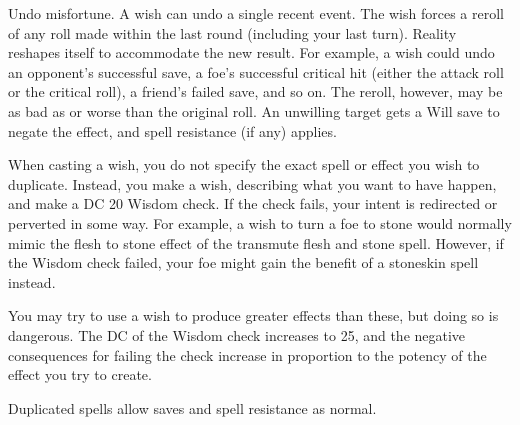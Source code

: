 \begin{spelleffect}
\begin{itemize*}
    \item Undo misfortune. A wish can undo a single recent event. The wish forces a reroll of any roll made within the last round (including your last turn). Reality reshapes itself to accommodate the new result. For example, a wish could undo an opponent's successful save, a foe's successful critical hit (either the attack roll or the critical roll), a friend's failed save, and so on. The reroll, however, may be as bad as or worse than the original roll. An unwilling target gets a Will save to negate the effect, and spell resistance (if any) applies.
  \end{itemize*}
  \par When casting a wish, you do not specify the exact spell or effect you wish to duplicate. Instead, you make a wish, describing what you want to have happen, and make a DC 20 Wisdom check. If the check fails, your intent is redirected or perverted in some way. For example, a wish to turn a foe to stone would normally mimic the flesh to stone effect of the transmute flesh and stone spell. However, if the Wisdom check failed, your foe might gain the benefit of a stoneskin spell instead.
  \par You may try to use a wish to produce greater effects than these, but doing so is dangerous. The DC of the Wisdom check increases to 25, and the negative consequences for failing the check increase in proportion to the potency of the effect you try to create.
\end{spelleffect}
\begin{spellnotes}
  Duplicated spells allow saves and spell resistance as normal.
\end{spellnotes}

